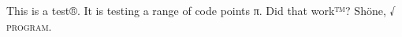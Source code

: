\documentclass{article}
\begin{document}
This is a test®.  It is testing a range of code points π.  Did that
work™?  Shöne, √ \textsc{program}.

\textrm{\blindtext[1]}\par
\textsf{\blindtext[1]}\par
\textbf{\blindtext[1]}\par
\textit{\blindtext[1]}\par
\textbf{\textit{\blindtext[1]}}\par
\texttt{\blindtext[1]}\par

\blindmathpaper%
\end{document}
